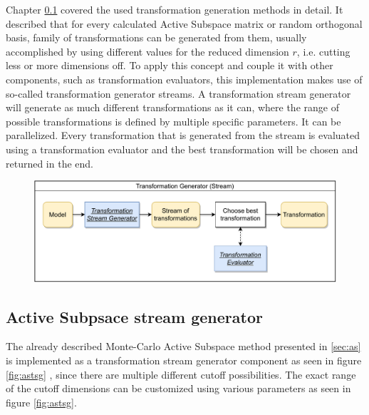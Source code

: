 \documentclass[
  a4paper,  %
  twoside,  %
  bibliography=totoc,
  headsepline,
  cleardoublepage=empty,
  parskip=half,
  draft=false
]{scrbook}
\begin{document}
Chapter \ref{} covered the used transformation generation methods in detail.
It described that for every calculated Active Subspace matrix or random orthogonal basis, family of transformations can be generated from them, usually accomplished by using different values for the reduced dimension $r$, i.e. cutting less or more dimensions off.
To apply this concept and couple it with other components, such as transformation evaluators, this implementation makes use of so-called transformation generator streams.
A transformation stream generator will generate as much different transformations as it can, where the range of possible transformations is defined by multiple specific parameters.
It can be parallelized.
Every transformation that is generated from the stream is evaluated using a transformation evaluator and the best transformation will be chosen and returned in the end.

\begin{figure}[H]
\includegraphics[width=\textwidth]{graphics/TransformationGen_Stream.pdf}
\end{figure}

\newpage

\subsection{Active Subpsace stream generator}

The already described Monte-Carlo Active Subspace method presented in \ref{sec:as} is implemented as a transformation stream generator component as seen in figure \ref{fig:astsg} , since there are multiple different cutoff possibilities.
The exact range of the cutoff dimensions can be customized using various parameters as seen in figure \ref{fig:astsg}.
\end{document}

